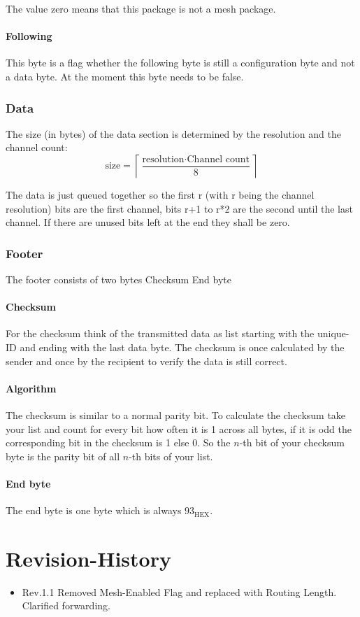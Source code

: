 \documentclass{scrreprt}
\begin{document}
The value zero means that this package is not a mesh package.

\subsubsection{Following}
This byte is a flag whether the following byte is still a configuration
byte and not a data byte. At the moment this byte needs to be false.

\subsection{Data}
The size (in bytes) of the data section is determined by
the resolution and the channel count:
\begin{equation}
  \text{size} = \left\lceil{\frac{\text{resolution} \cdot \text{Channel count}}{8}} \right\rceil
\end{equation}

The data is just queued together so the first r (with r being the channel
resolution) bits are the first channel, bits r+1 to r*2 are the second
until the last channel. If there are unused bits left at the end they shall be zero.

\subsection{Footer}
The footer consists of two bytes Checksum End byte

\subsubsection{Checksum}
For the checksum think of the transmitted data as list starting with the
unique-ID and ending with the last data byte. The checksum is once
calculated by the sender and once by the recipient to verify the data is
still correct.

\subsubsection{Algorithm}
The checksum is similar to a normal parity bit. To calculate the checksum
take your list and count for every bit how often it is 1 across all bytes,
if it is odd the corresponding bit in the checksum is 1 else 0.
So the $n$-th bit of your checksum byte is the parity bit of all $n$-th
bits of your list.

\subsubsection{End byte}
The end byte is one byte which is always $93_\text{HEX}$.

\pagebreak
\chapter{Revision-History}
\begin{itemize}
  \item Rev.1.1 Removed Mesh-Enabled Flag and replaced with Routing Length. Clarified forwarding.
\end{itemize}
\end{document}
